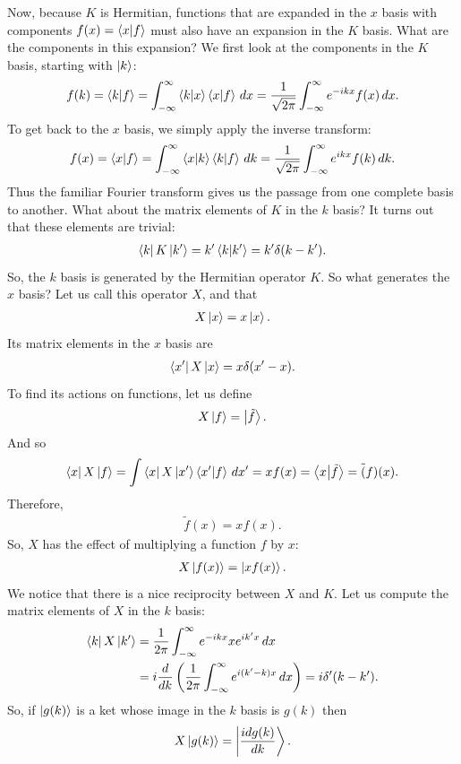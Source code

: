 \documentclass{book}
\theoremstyle{definition}
\newcommand{\f}[2]{\frac{#1}{#2}}
\newcommand{\lp}{\left(}
\newcommand{\rp}{\right)}
\begin{document}
Now, because $K$ is Hermitian, functions that are expanded in the $x$ basis with components $f(x) = \braket{x}{f}$ must also have an expansion in the $K$ basis. What are the components in this expansion? We first look at the components in the $K$ basis, starting with $\ket{k}$:
\begin{align}
f(k) = \braket{k}{f} = \int^\infty_{-\infty} \braket{k}{x}\braket{x}{f}\,dx = \f{1}{\sqrt{2\pi}}\int^\infty_{-\infty} e^{-ikx}f(x)\,dx. 
\end{align}
To get back to the $x$ basis, we simply apply the inverse transform:
\begin{align}
f(x) = \braket{x}{f} = \int^\infty_{-\infty}   \braket{x}{k}\braket{k}{f}\,dk = \f{1}{\sqrt{2\pi}}\int^\infty_{-\infty} e^{ikx}f(k)\,dk.
\end{align}
Thus the familiar Fourier transform gives us the passage from one complete basis to another. What about the matrix elements of $K$ in the $k$ basis? It turns out that these elements are trivial:  
\begin{align}
\bra{k}K\ket{k'} = k'\braket{k}{k'} = k'\delta(k-k').
\end{align}
So, the $k$ basis is generated by the Hermitian operator $K$. So what generates the $x$ basis? Let us call this operator $X$, and that 
\begin{align}
X\ket{x} = x\ket{x}. 
\end{align}
Its matrix elements in the $x$ basis are
\begin{align}
\bra{x'}X\ket{x} = x\delta(x'-x).
\end{align}
To find its actions on functions, let us define
\begin{align}
X\ket{f} = \ket{\tilde{f}}.
\end{align}
And so
\begin{align}
\bra{x}X\ket{f} = \int  \bra{x}X\ket{x'}\bra{x'}\ket{f}\,dx' = xf(x) = \braket{x}{\tilde{f}} = \tilde(f)(x).
\end{align}
Therefore,
\begin{align}
\tilde{f}(x) = xf(x).
\end{align}
So, $X$ has the effect of multiplying a function $f$ by $x$:
\begin{align}
X\ket{f(x)} = \ket{xf(x)}.
\end{align}
We notice that there is a nice reciprocity between $X$ and $K$. Let us compute the matrix elements of $X$ in the $k$ basis:
\begin{align}
\bra{k}X\ket{k'} &= \f{1}{2\pi}\int^\infty_{-\infty} e^{-ikx} x e^{ik'x} \,dx \\
&= i\f{d}{dk} \lp \f{1}{2\pi}\int^\infty_{-\infty} e^{i(k'-k)x}\,dx \rp = i\delta'(k-k').
\end{align}
So, if $\ket{g(k)}$ is a ket whose image in the $k$ basis is $g(k)$ then
\begin{align}
X\ket{g(k)} = \ket{\f{idg(k)}{dk}}.
\end{align}
\end{document}
